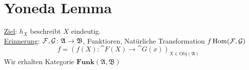 \section{Yoneda Lemma}
\underline{Ziel}: $h_X$ beschreibt $X$ eindeutig.\\
\underline{Erinnerung}: $\mathcal{F},\cal{G}\colon \mathfrak{A} \rightarrow \mathfrak{B}$, Funktioren, Natürliche Transformation $f \operatorname{\mathrm{Hom}}(\mathcal{F},\mathcal{G})$
\[
f= {\left( f(X)\colon \cat{F}(X) \rightarrow \cat{G}(x) \right)}_{X \in \text{Obj}(\mathfrak{A})}
\]
Wir erhalten Kategorie $\textbf{Funk}(\mathfrak{A},\mathfrak{B})$